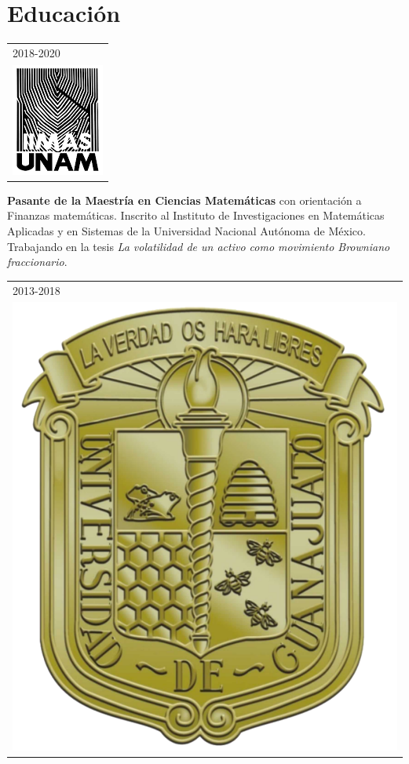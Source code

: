 \documentclass[]{friggeri-cv}
\begin{document}
\section{Educación}
\begin{entrylist}
  \entry
     {   \begin{tabular}{l}
    		\hspace{0.8cm}2018-2020\\
     		\hspace{0.9cm}\includegraphics[scale=0.4]{img/iimas.png}
	\end{tabular}
    }
    {\vspace{-1.46cm}}
    { }
    {\textbf{Pasante de la Maestría en Ciencias Matemáticas} con orientación a Finanzas matemáticas. Inscrito al Instituto de Investigaciones en Matemáticas Aplicadas y en Sistemas de la Universidad Nacional Autónoma de México. Trabajando en la tesis \textsl{La volatilidad de un activo como movimiento Browniano fraccionario}.}
    \entry
    {   \begin{tabular}{l}
    		\hspace{0.8cm}2013-2018\\
     		\hspace{0.9cm}\includegraphics[scale=0.5]{img/UGTO.png}

\end{tabular}}
\end{entrylist}
\end{document}
